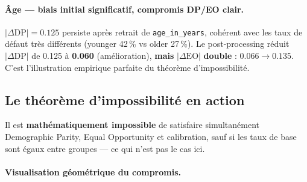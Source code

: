 \documentclass[11pt, a4paper]{article}
\begin{document}
\paragraph{\^{A}ge --- biais initial significatif, compromis DP/EO clair.}
$|\Delta\text{DP}| = 0.125$ persiste apr\`{e}s retrait de \texttt{age\_in\_years}, coh\'{e}rent avec les taux de d\'{e}faut tr\`{e}s diff\'{e}rents (younger 42\,\% vs older 27\,\%). Le post-processing r\'{e}duit $|\Delta\text{DP}|$ de 0.125 \`{a} \textbf{0.060} (am\'{e}lioration), \textbf{mais} $|\Delta\text{EO}|$ \textbf{double} : $0.066 \to 0.135$. C'est l'illustration empirique parfaite du th\'{e}or\`{e}me d'impossibilit\'{e}.

\subsection{Le th\'{e}or\`{e}me d'impossibilit\'{e} en action}
\label{sec:impossibility}

\begin{attentionbox}
Il est \textbf{math\'{e}matiquement impossible} de satisfaire simultan\'{e}ment Demographic Parity, Equal Opportunity et calibration, sauf si les taux de base sont \'{e}gaux entre groupes --- ce qui n'est pas le cas ici.
\end{attentionbox}

\paragraph{Visualisation g\'{e}om\'{e}trique du compromis.}
\end{document}
